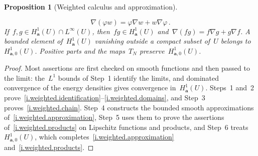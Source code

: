 \documentclass[11pt,letterpaper]{article}
\numberwithin{equation}{section}
\newtheorem{proposition}[theorem]{Proposition}
\theoremstyle{definition}
\renewcommand{\a}{\mathbf{a}}
\newcommand{\Hzero}[1]{H^1_{#1,0}}
\begin{document}
\begin{proposition}[Weighted calculus and approximation]
\begin{enumerate}[label=\textup{(\roman*)}]
\begin{equation}
	\nabla(\varphi w)=\varphi\nabla w+w\nabla\varphi\,.
	\label{e.weighted.product}
\end{equation}
If~$f,g\in H^1_\a(U)\cap L^\infty(U)$, then~$fg\in H^1_\a(U)$ and~$\nabla(fg)=f\nabla g+g\nabla f$. A bounded element of~$H^1_\a(U)$ vanishing outside a compact subset of~$U$ belongs to~$\Hzero{\a}(U)$. Positive parts and the maps~$T_N$ preserve~$\Hzero{\a}(U)$.
\end{enumerate}
\end{proposition}

\begin{proof}
Most assertions are first checked on smooth functions and then passed to the limit: the~$L^1$ bounds of Step~1 identify the limits, and dominated convergence of the energy densities gives convergence in~$H^1_\a(U)$. Steps~1 and~2 prove~\ref{i.weighted.identification}--\ref{i.weighted.domains}, and Step~3 proves~\ref{i.weighted.chain}. Step~4 constructs the bounded smooth approximations of~\ref{i.weighted.approximation}, Step~5 uses them to prove the assertions of~\ref{i.weighted.products} on Lipschitz functions and products, and Step~6 treats~$\Hzero{\a}(U)$, which completes~\ref{i.weighted.approximation} and~\ref{i.weighted.products}.

\smallskip


\end{proof}
\end{document}
